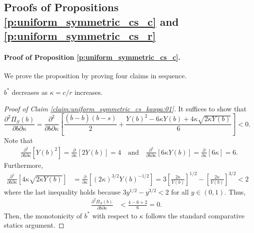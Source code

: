 \begin{appendices}
\section{Proofs of Propositions \ref{p:uniform_symmetric_cs_c} and \ref{p:uniform_symmetric_cs_r}}

\paragraph{Proof of Proposition \ref{p:uniform_symmetric_cs_c}.}
We prove the proposition by proving four claims in sequence. 

\begin{claim}\label{claim:uniform_symmetric_cs_kappa:01}
$b^*$ decreases as $\kappa=c/r$ increases. 
\end{claim}

\begin{proof}[Proof of Claim \ref{claim:uniform_symmetric_cs_kappa:01}]
It suffices to show that 
    $$
    \frac{\partial^2\Pi_S(b)}{\partial b\partial \kappa} 
    =
    \frac{\partial^2}{\partial b\partial \kappa}\left[\frac{(\overline b-b)(b-s)}{2} + \frac{Y(b)^2-6\kappa Y(b)+4\kappa\sqrt{2\kappa Y(b)}}{6}\right]<0. 
    $$
Note that
    \begin{align*}
    &\frac{\partial^2}{\partial b\partial \kappa} [Y(b)^2] 
    = \frac{\partial}{\partial \kappa}[2Y(b)]=
    4
    \quad\text{and}\quad
    \frac{\partial^2}{\partial b\partial \kappa} [6\kappa Y(b)]
    =\frac{\partial}{\partial \kappa}[6\kappa] = 6. 
    \end{align*}
Furthermore,
    \begin{align*}
    \frac{\partial^2}{\partial b\partial \kappa}
    [4\kappa\sqrt{2\kappa Y(b)}]
    &=\frac{\partial}{\partial \kappa}[ (2\kappa)^{3/2} Y(b)^{-1/2}]
    = 3 \left[\frac{2\kappa}{Y(b)}\right]^{1/2}- \left[\frac{2\kappa}{Y(b)}\right]^{3/2}<2
    \end{align*}
where the last inequality holds because $3y^{1/2}- y^{3/2}< 2$ for all $y\in(0,1)$. Thus,
    \begin{align*}
    \frac{\partial^2\Pi_S(b)}{\partial b\partial \kappa} 
    &
    < \frac{4-6+2}{6} =0.
    \end{align*}
Then, the monotonicity of $b^*$ with respect to $\kappa$ follows the standard comparative statics argument. 
\end{proof}



\end{appendices}
